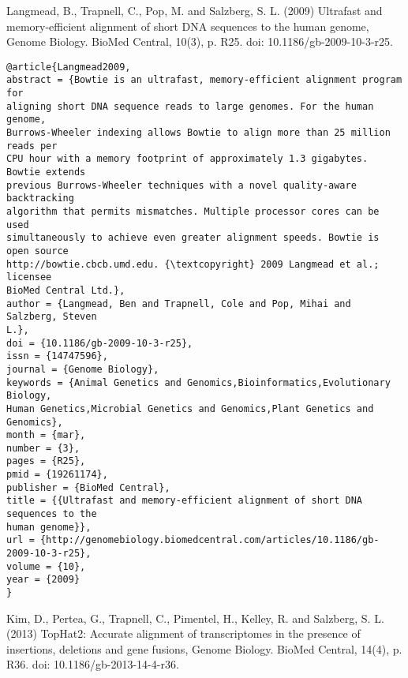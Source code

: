 \documentclass[]{article}
\begin{document}
Langmead, B., Trapnell, C., Pop, M. and Salzberg, S. L. (2009) Ultrafast and memory-efficient alignment of short DNA sequences to the human genome, Genome Biology. BioMed Central, 10(3), p. R25. doi: 10.1186/gb-2009-10-3-r25.

\begin{verbatim}
@article{Langmead2009,
abstract = {Bowtie is an ultrafast, memory-efficient alignment program for
aligning short DNA sequence reads to large genomes. For the human genome,
Burrows-Wheeler indexing allows Bowtie to align more than 25 million reads per
CPU hour with a memory footprint of approximately 1.3 gigabytes. Bowtie extends
previous Burrows-Wheeler techniques with a novel quality-aware backtracking
algorithm that permits mismatches. Multiple processor cores can be used
simultaneously to achieve even greater alignment speeds. Bowtie is open source
http://bowtie.cbcb.umd.edu. {\textcopyright} 2009 Langmead et al.; licensee
BioMed Central Ltd.},
author = {Langmead, Ben and Trapnell, Cole and Pop, Mihai and Salzberg, Steven 
L.},
doi = {10.1186/gb-2009-10-3-r25},
issn = {14747596},
journal = {Genome Biology},
keywords = {Animal Genetics and Genomics,Bioinformatics,Evolutionary Biology,
Human Genetics,Microbial Genetics and Genomics,Plant Genetics and Genomics},
month = {mar},
number = {3},
pages = {R25},
pmid = {19261174},
publisher = {BioMed Central},
title = {{Ultrafast and memory-efficient alignment of short DNA sequences to the
human genome}},
url = {http://genomebiology.biomedcentral.com/articles/10.1186/gb-2009-10-3-r25},
volume = {10},
year = {2009}
}

\end{verbatim}

Kim, D., Pertea, G., Trapnell, C., Pimentel, H., Kelley, R. and Salzberg, S. L. (2013) TopHat2: Accurate alignment of transcriptomes in the presence of insertions, deletions and gene fusions, Genome Biology. BioMed Central, 14(4), p. R36. doi: 10.1186/gb-2013-14-4-r36.
\end{document}
